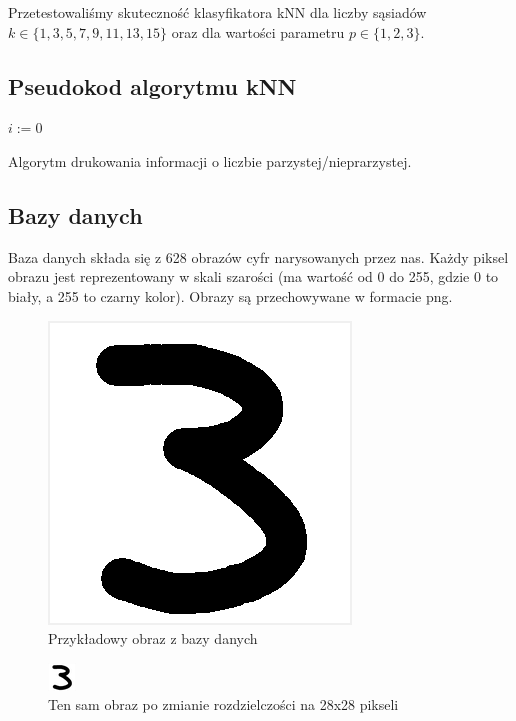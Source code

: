 \documentclass[12pt,a4paper]{article}
\begin{document}
\noindent Przetestowaliśmy skuteczność klasyfikatora kNN dla liczby sąsiadów $k \in \{1, 3, 5, 7, 9, 11, 13, 15\}$ oraz
dla wartości parametru $p \in \{1, 2, 3\}$.

\subsection*{Pseudokod algorytmu kNN}
\begin{algorithm}[H]
	$i:=0$\;
	\caption{Algorytm drukowania informacji o liczbie parzystej/nieprarzystej.}
\end{algorithm}

\subsection*{Bazy danych}
Baza danych składa się z 628 obrazów cyfr narysowanych przez nas. Każdy piksel obrazu jest reprezentowany w skali
szarości (ma wartość od 0 do 255, gdzie 0 to biały, a 255 to czarny kolor). Obrazy są przechowywane w formacie png.
\newpage
\begin{figure}[!h]
	\includegraphics[scale=0.8]{"number_example.png"}
	\centering
	\caption{Przykładowy obraz z bazy danych}
\end{figure}
\begin{figure}[!h]
	\includegraphics[scale=8]{"normalized.png"}
	\centering
	\caption{Ten sam obraz po zmianie rozdzielczości na 28x28 pikseli}
\end{figure}
\end{document}
